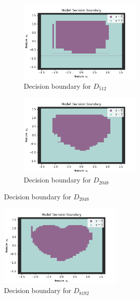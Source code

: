 \documentclass[a4paper]{article}
\theoremstyle{definition}
\newenvironment{soln}{
    \leavevmode\color{blue}\ignorespaces
}{}
\begin{document}
\begin{soln}
\begin{itemize}
      \begin{figure}[H]
        \centering
        \begin{subfigure}[b]{0.3\textwidth}
            \centering
            \includegraphics[width=6cm]{D512_trn_decision_boundary.png}
            \caption{Decision boundary for $D_{512}$}
            \label{fig:d32_vis}
        \end{subfigure}
        \begin{subfigure}[b]{0.3\textwidth}
            \centering
            \includegraphics[width=6cm]{D2048_trn_decision_boundary.png}
            \caption{Decision boundary for $D_{2048}$}
            \label{fig:d128_vis}
        \end{subfigure}
        \label{fig:q2_11}
    \end{figure}

    \begin{figure}[H]
      \centering
      \includegraphics[width=6cm]{D8192_trn_decision_boundary.png}
      \caption{Decision boundary for $D_{8192}$}
      \label{fig:q2_12}
    \end{figure}


  \end{itemize}
\end{soln}
\end{document}
